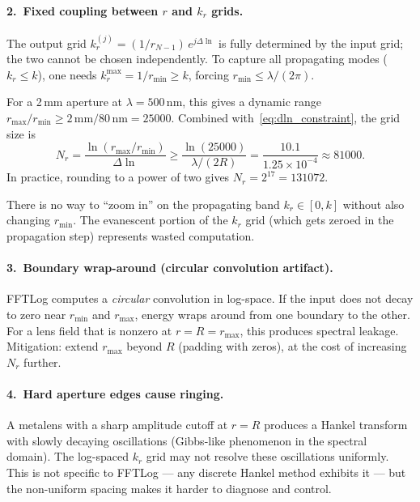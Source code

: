 \documentclass[11pt,a4paper]{article}
\begin{document}
\paragraph{2.\ Fixed coupling between $r$ and $k_r$ grids.}
The output grid $k_r^{(j)} = (1/r_{N-1})\,e^{j\Delta\!\ln}$ is fully determined
by the input grid; the two cannot be chosen independently.  To capture all
propagating modes ($k_r \le k$), one needs $k_r^{\max} = 1/r_{\min} \ge k$,
forcing $r_{\min} \le \lambda/(2\pi)$.

For a 2\,mm aperture at $\lambda = 500$\,nm, this gives a dynamic range
$r_{\max}/r_{\min} \ge 2\,\text{mm}/80\,\text{nm} = 25000$.  Combined
with~\eqref{eq:dln_constraint}, the grid size is
\begin{equation}
  N_r = \frac{\ln(r_{\max}/r_{\min})}{\Delta\!\ln}
  \ge \frac{\ln(25000)}{\lambda/(2R)}
  = \frac{10.1}{1.25\times 10^{-4}}
  \approx 81000.
\end{equation}
In practice, rounding to a power of two gives $N_r = 2^{17} = 131072$.

There is no way to ``zoom in'' on the propagating band $k_r \in [0, k]$ without
also changing $r_{\min}$.  The evanescent portion of the $k_r$ grid (which gets
zeroed in the propagation step) represents wasted computation.

\paragraph{3.\ Boundary wrap-around (circular convolution artifact).}
FFTLog computes a \emph{circular} convolution in log-space.  If the input does
not decay to zero near $r_{\min}$ and $r_{\max}$, energy wraps around from one
boundary to the other.  For a lens field that is nonzero at $r = R = r_{\max}$,
this produces spectral leakage.  Mitigation: extend $r_{\max}$ beyond $R$ (padding
with zeros), at the cost of increasing $N_r$ further.

\paragraph{4.\ Hard aperture edges cause ringing.}
A metalens with a sharp amplitude cutoff at $r = R$ produces a Hankel transform
with slowly decaying oscillations (Gibbs-like phenomenon in the spectral domain).
The log-spaced $k_r$ grid may not resolve these oscillations uniformly.  This is
not specific to FFTLog --- any discrete Hankel method exhibits it --- but the
non-uniform spacing makes it harder to diagnose and control.
\end{document}
